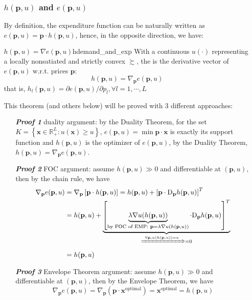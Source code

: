 \subsubsection*{$h(\mathbf{p},u)$ and $e(\mathbf{p},u)$}
By definition, the expenditure function can be naturally written as $e(\mathbf{p},u)=\mathbf{p}\cdot h(\mathbf{p},u)$, hence, in the opposite direction, we have:
\begin{theorem}{$h(\mathbf{p},u)=\nabla e(\mathbf{p},u)$}{hdemand_and_exp}
    With a continuous $u(\cdot)$ representing a locally nonsatiated and strictly convex $\succsim$, the  is the derivative vector of $e(\mathbf{p},u)$ w.r.t. prices $\mathbf{p}$:
    $$h(\mathbf{p},u)=\nabla_{\mathbf{p}}e(\mathbf{p},u)$$
    that is, $h_l(\mathbf{p},u)=\partial e(\mathbf{p},u)/\partial p_l,\forall l=1,\cdots,L$
\end{theorem}
This theorem (and others below) will be proved with 3 different approaches:
\begin{enumerate}
    \item[\textit{\textbf{Proof 1}}] duality argument: by the Duality Theorem, for the set $K=\left\{\mathbf{x}\in\mathbb{R}^L_+:u(\mathbf{x})\geq u \right\}$, $e(\mathbf{p},u)=\min\mathbf{p}\cdot\mathbf{x}$ is exactly its support function and $h(\mathbf{p},u)$ is the optimizer of $e(\mathbf{p},u)$, by the Duality Theorem, $h(\mathbf{p},u)=\nabla_{\mathbf{p}}e(\mathbf{p},u)$.
    \item[\textit{\textbf{Proof 2}}] FOC argument: assume $h(\mathbf{p},u)\gg 0$ and differentiable at $(\mathbf{p},u)$, then by the chain rule, we have 
    \begin{align*}
        \nabla_{\mathbf{p}}e(\mathbf{p},u)&=\nabla_{\mathbf{p}}\left[\mathbf{p}\cdot h(\mathbf{p},u)\right]=h(\mathbf{p},u)+\left[\mathbf{p}\cdot \mathrm{D}_{\mathbf{p}}h(\mathbf{p},u)\right]^T\\
        &=h(\mathbf{p},u)+\underbrace{\left[\underbrace{\lambda\nabla u(h(\mathbf{p},u))}_{\text{by FOC of EMP: }\mathbf{p}=\lambda\nabla u(h(\mathbf{p},u))} \cdot \mathrm{D}_{\mathbf{p}}h(\mathbf{p},u)\right]^T}_{\xRightarrow{\forall \mathbf{p},u(h(\mathbf{p},u))=u}=0}\\
        & = h(\mathbf{p},u)
    \end{align*}
    \item[\textit{\textbf{Proof 3}}] Envelope Theorem argument: assume $h(\mathbf{p},u)\gg 0$ and differentiable at $(\mathbf{p},u)$, then by the Envelope Theorem, we have 
    $$\nabla_{\mathbf{p}}e(\mathbf{p},u)=\nabla_{\mathbf{p}}(\mathbf{p}\cdot \mathbf{x}^{\text{optimal}})=\mathbf{x}^{\text{optimal}}=h(\mathbf{p},u)$$
\end{enumerate}

